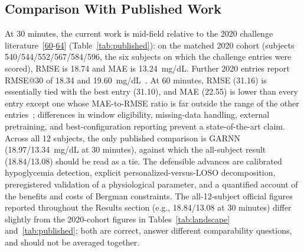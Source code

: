 \documentclass[journal]{IEEEtran}
\begin{document}
\subsection{Comparison With Published Work}

At 30 minutes, the current work is mid-field relative to the 2020 challenge literature~[\hyperref[ref60label]{60}-\hyperref[ref64label]{64}] (Table~\ref{tab:published}): on the matched 2020 cohort (subjects 540/544/552/567/584/596, the six subjects on which the challenge entries were scored), RMSE is 18.74 and MAE is 13.24~mg/dL. Further 2020 entries report RMSE@30 of 18.34 and 19.60~mg/dL~\cite{ref65,ref70}. At 60 minutes, RMSE (31.16) is essentially tied with the best entry (31.10), and MAE (22.55) is lower than every entry except one whose MAE-to-RMSE ratio is far outside the range of the other entries~\cite{ref60}; differences in window eligibility, missing-data handling, external pretraining, and best-configuration reporting prevent a state-of-the-art claim. Across all 12 subjects, the only published comparison is GARNN~\cite{ref75} (18.97/13.34~mg/dL at 30 minutes), against which the all-subject result (18.84/13.08) should be read as a tie. The defensible advances are calibrated hypoglycemia detection, explicit personalized-versus-LOSO decomposition, preregistered validation of a physiological parameter, and a quantified account of the benefits and costs of Bergman constraints. The all-12-subject official figures reported throughout the Results section (e.g., 18.84/13.08 at 30 minutes) differ slightly from the 2020-cohort figures in Tables~\ref{tab:landscape} and~\ref{tab:published}; both are correct, answer different comparability questions, and should not be averaged together.
\end{document}
